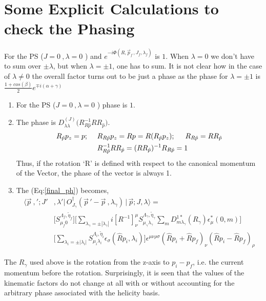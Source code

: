 \documentclass[10pt]{article}
\begin{document}
\section{Some Explicit Calculations to check the Phasing}
For the PS ($J = 0\ ,\lambda = 0$ ) and $e^{-i \Phi(R, \vec{p}_f\,, J_f, \lambda_f)}$ is $1$. When $\lambda = 0$ we don't have to sum over $\pm \lambda$, but when $\lambda = \pm 1$, one has to sum. It is not clear how in the case of $\lambda \ne 0$ the overall factor turns out to be just a phase as the phase for $\lambda = \pm 1$ is $\frac{1 + cos(\beta)}{2}e^{\mp i(\alpha + \gamma)}$
\begin{enumerate}
	\item For the PS ($J = 0\ ,\lambda = 0$ ) phase is $1$. 

	\item The phase is $D^{(J)}_{\lambda\lambda}\big(R^{-1}_{R\hat{p}} R  R_{\hat{p}} \big)$.
\begin{align*}
R_{\hat{p}}p_z = p; \hspace{5mm}  
&R_{R\hat{p}} p_z = Rp = R(R_{\hat{p}}p_z ) ; \hspace{5mm} 
R_{R\hat{p}} = RR_{\hat{p}}\\
&R^{-1}_{R\hat{p}} R  R_{\hat{p}} = (RR_{\hat{p}})^{-1}R_{R\hat{p}} = 1
\end{align*}
Thus, if the rotation `R' is defined with respect to the canonical momentum of the Vector, the phase of the vector is always 1.
	\item The (Eq:\ref{final_ph}) becomes,
\begin{align*}
\big\langle \vec{p}\ ,'; J'& ,\lambda'  \big| \, O_{J_\gamma}^{\dagger}(\vec{p}\,' - \vec{p}\ ,\lambda_{\gamma}) \, \big| \, \vec{p}; J, \lambda  \big\rangle = \\
&\Big[  S^{ \Lambda_f,\tilde{\eta}_f  }_{\mu_f 0} \Big] 
\Big[ \sum_{\lambda_{\gamma} = \pm|\lambda_{\gamma}|} i \left[R^{-1}\right]^\mu_\nu S^{ \Lambda_{\gamma},\tilde{\eta}_{\gamma}  }_{\mu_{\gamma} \lambda_{\gamma} } \sum_{m}D^{1*}_{m\lambda_{\gamma}}(R_\gamma)\epsilon^{*}_{\mu}(0, m)\Big ] \\
&\Big[  \sum_{\lambda_i = \pm|\lambda_i| } S^{ \Lambda_i,\tilde{\eta}_i  }_{\mu_i\lambda_i} \epsilon_{\sigma}(\hat{R}p_i, \lambda_i) \Big]  \epsilon^{\mu\nu\rho\sigma}(\hat{R}p_i + \hat{R}p_f)_{\nu}(\hat{R}p_i - \hat{R}p_f)_{\rho}
\label{final_ph1}
\end{align*}	
\end{enumerate}
The $R_\gamma$ used above is the rotation from the z-axis to $p_i - p_f$, i.e. the current momentum before the rotation. Surprisingly, it is seen that the values of the kinematic factors do not change at all with or without accounting for the arbitrary phase associated with the helicity basis. \par
\end{document}
